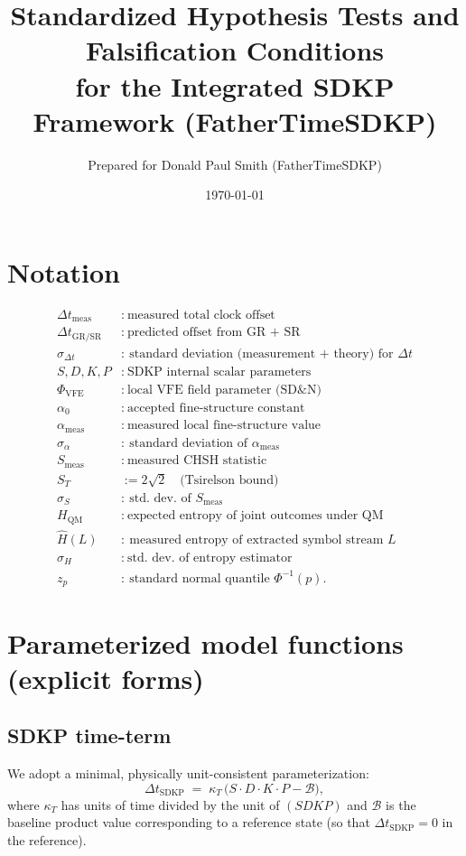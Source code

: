 \documentclass{article}
\begin{document}
\title{Standardized Hypothesis Tests and Falsification Conditions\\
for the Integrated SDKP Framework (FatherTimeSDKP)}
\author{Prepared for Donald Paul Smith (FatherTimeSDKP)}
\date{\today}
\maketitle

\section*{Notation}
\begin{align*}
\Delta t_{\mathrm{meas}} &\colon\ \text{measured total clock offset}\\
\Delta t_{\mathrm{GR/SR}} &\colon\ \text{predicted offset from GR + SR}\\
\sigma_{\Delta t} &\colon\ \text{standard deviation (measurement + theory) for } \Delta t\\
S,D,K,P &\colon\ \text{SDKP internal scalar parameters}\\
\Phi_{\mathrm{VFE}} &\colon\ \text{local VFE field parameter (SD\&N)}\\
\alpha_0 &\colon\ \text{accepted fine-structure constant}\\
\alpha_{\mathrm{meas}} &\colon\ \text{measured local fine-structure value}\\
\sigma_\alpha &\colon\ \text{standard deviation of } \alpha_{\mathrm{meas}}\\
S_{\mathrm{meas}} &\colon\ \text{measured CHSH statistic}\\
S_T &:= 2\sqrt{2}\quad\text{(Tsirelson bound)}\\
\sigma_S &\colon\ \text{std.\ dev.\ of } S_{\mathrm{meas}}\\
H_{\mathrm{QM}} &\colon\ \text{expected entropy of joint outcomes under QM}\\
\widehat H(L) &\colon\ \text{measured entropy of extracted symbol stream }L\\
\sigma_H &\colon\ \text{std.\ dev.\ of entropy estimator}\\
z_{p} &\colon\ \text{standard normal quantile } \Phi^{-1}(p).
\end{align*}

\section{Parameterized model functions (explicit forms)}
\subsection{SDKP time-term}
We adopt a minimal, physically unit-consistent parameterization:
\[
\Delta t_{\mathrm{SDKP}} \;=\; \kappa_T \, \big( S\cdot D\cdot K\cdot P - \mathcal{B} \big),
\]
where $\kappa_T$ has units of time divided by the unit of $(S\!D\!K\!P)$ and $\mathcal{B}$ is the baseline product value corresponding to a reference state (so that $\Delta t_{\mathrm{SDKP}}=0$ in the reference).
\end{document}
